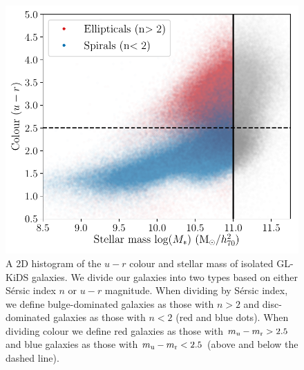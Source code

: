 \documentclass[usenatbib]{mnras}
\newcommand{\un}[1]{_{\rm #1}}
\begin{document}
\begin{figure}
	\includegraphics[width=\columnwidth]{Figures/galaxy_morphology_color_u-r.pdf}
	\caption{A 2D histogram of the $u-r$ colour and stellar mass of isolated GL-KiDS galaxies. We divide our galaxies into two types based on either S\'ersic index $n$ or $u-r$ magnitude. When dividing by S\'ersic index, we define bulge-dominated galaxies as those with $n>2$ and disc-dominated galaxies as those with $n<2$ (red and blue dots). When dividing colour we define red galaxies as those with $m\un{u} - m\un{r} > 2.5$ and blue galaxies as those with $m\un{u} - m\un{r} < 2.5$ (above and below the dashed line).}
	\label{fig:galtypes_scatterplot}
\end{figure}
\end{document}
